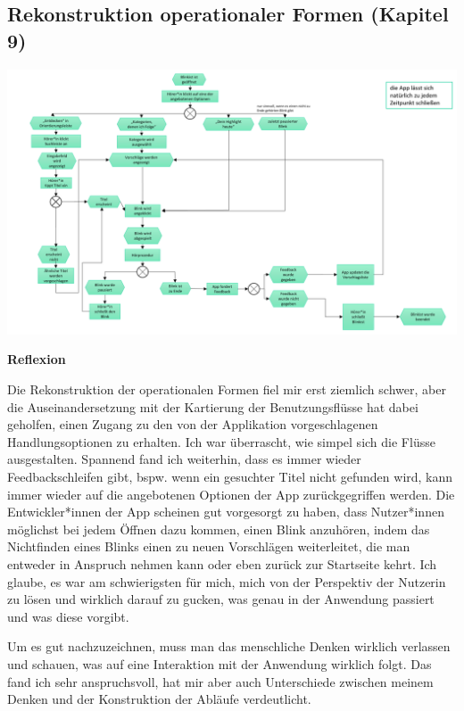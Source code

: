 \documentclass[
  a4paper,
]{book}
\begin{document}
\subsection*{Rekonstruktion operationaler Formen (Kapitel 9)}\label{rekonstruktion-operationaler-formen-kapitel-9}

\begin{center}\includegraphics{Figures/09-Bsp.1} \end{center}

\textbf{Reflexion}

Die Rekonstruktion der operationalen Formen fiel mir erst ziemlich schwer, aber die Auseinandersetzung mit der Kartierung der Benutzungsflüsse hat dabei geholfen, einen Zugang zu den von der Applikation vorgeschlagenen Handlungsoptionen zu erhalten. Ich war überrascht, wie simpel sich die Flüsse ausgestalten. Spannend fand ich weiterhin, dass es immer wieder Feedbackschleifen gibt, bspw. wenn ein gesuchter Titel nicht gefunden wird, kann immer wieder auf die angebotenen Optionen der App zurückgegriffen werden. Die Entwickler*innen der App scheinen gut vorgesorgt zu haben, dass Nutzer*innen möglichst bei jedem Öffnen dazu kommen, einen Blink anzuhören, indem das Nichtfinden eines Blinks einen zu neuen Vorschlägen weiterleitet, die man entweder in Anspruch nehmen kann oder eben zurück zur Startseite kehrt. Ich glaube, es war am schwierigsten für mich, mich von der Perspektiv der Nutzerin zu lösen und wirklich darauf zu gucken, was genau in der Anwendung passiert und was diese vorgibt.

Um es gut nachzuzeichnen, muss man das menschliche Denken wirklich verlassen und schauen, was auf eine Interaktion mit der Anwendung wirklich folgt. Das fand ich sehr anspruchsvoll, hat mir aber auch Unterschiede zwischen meinem Denken und der Konstruktion der Abläufe verdeutlicht.
\end{document}
